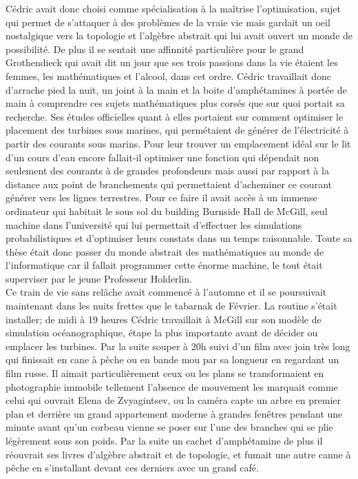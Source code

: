\documentclass{article}
\begin{document}
Cédric avait donc choisi comme spécialisation à la maîtrise l'optimisation,
sujet qui permet de s'attaquer à des problèmes de la vraie vie mais gardait un
oeil nostalgique vers la topologie et l'algèbre abstrait qui lui avait ouvert un
monde de possibilité. De plus il se sentait une affinnité particulière pour le
grand Grothendieck qui avait dit un jour que ses trois passions dans la vie
étaient les femmes, les mathématiques et l'alcool, dans cet ordre. Cédric
travaillait donc d'arrache pied la nuit, un joint à la main et la boite
d'amphétamines à portée de main à comprendre ces sujets mathématiques plus
corsés que sur quoi portait sa recherche. Ses études officielles quant à elles
portaient sur comment optimiser le placement des turbines sous marines, qui
permétaient de générer de l'électricité à partir des courants sous marins. Pour
leur trouver un emplacement idéal sur le lit d'un cours d'eau encore fallait-il
optimiser une fonction qui dépendait non seulement des courants à de grandes
profondeurs mais aussi par rapport à la distance aux point de branchements qui
permettaient d'acheminer ce courant générer vers les lignes terrestres. Pour ce
faire il avait accès à un immense ordinateur qui habitait le sous sol du
building Burnside Hall de McGill, seul machine dans l'université qui lui
permettait d'effectuer les simulations probabilistiques et d'optimiser leurs
constats dans un temps raisonnable. Toute sa thèse était donc passer du monde
abstrait des mathématiques au monde de l'informatique car il fallait programmer
cette énorme machine, le tout était superviser par le jeune Professeur
Holderlin.\\

Ce train de vie sans relâche avait commencé à l'automne et il se poursuivait
maintenant dans les nuits frettes que le tabarnak de Février. La routine s'était
installer; de midi à 19 heures Cédric travaillait à McGill sur son modèle de
simulation océanographique, étape la plus importante avant de décider ou
emplacer les turbines. Par la suite souper à 20h suivi d'un film avec join très
long qui finissait en cane à pèche ou en bande mou par sa longueur en regardant
un film russe. Il aimait particulièrement ceux ou les plans se transformaient en
photographie immobile tellement l'absence de mouvement les marquait comme celui
qui ouvrait Elena de Zvyagintsev, ou la caméra capte un arbre en premier plan et
derrière un grand appartement moderne à grandes fenêtres pendant une minute
avant qu'un corbeau vienne se poser sur l'une des branches qui se plie
légèrement sous son poids. Par la suite un cachet d'amphétamine de plus il
réouvrait ses livres d'algèbre abstrait et de topologie, et fumait une autre
canne à pêche en s'installant devant ces derniers avec un grand café.\\
\end{document}
